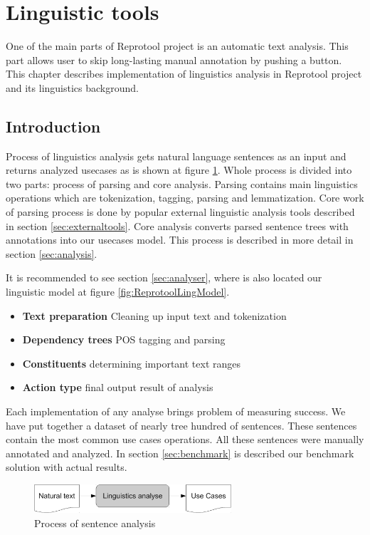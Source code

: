 \section{Linguistic tools}

One of the main parts of Reprotool project is an automatic text analysis. This part allows user to skip long-lasting manual annotation by pushing a button. This chapter describes implementation of linguistics analysis in Reprotool project and its linguistics background.

\subsection{Introduction}
Process of linguistics analysis gets natural language sentences as an input and returns analyzed usecases as is shown at figure \ref{fig:LinguisticsAnalyseSmall}. Whole process is divided into two parts: process of parsing and core analysis. Parsing contains main linguistics operations which are tokenization, tagging, parsing and lemmatization. Core work of parsing process is done by popular external linguistic analysis tools described in section \ref{sec:externaltools}. Core analysis converts parsed sentence trees with annotations into our usecases model. This process is described in more detail in section \ref{sec:analysis}. 

It is recommended to see section \ref{sec:analyser}, where is also located our linguistic model at figure \ref{fig:ReprotoolLingModel}.

\begin{itemize}
\item {\bf Text preparation} Cleaning up input text and tokenization
\item {\bf Dependency trees} POS tagging and parsing
\item {\bf Constituents} determining important text ranges
\item {\bf Action type} final output result of analysis
\end{itemize}

Each implementation of any analyse brings problem of measuring success. We have put together a dataset of nearly tree hundred of sentences. These sentences contain the most common use cases operations. All these sentences were manually annotated and analyzed. In section \ref{sec:benchmark} is described our benchmark solution with actual results.

\begin{figure}[ht]
  \centering
  \includegraphics[height=30pt]{images/LinguisticsAnalyseSmall}
  \caption{Process of sentence analysis}
  \label{fig:LinguisticsAnalyseSmall}
\end{figure}

